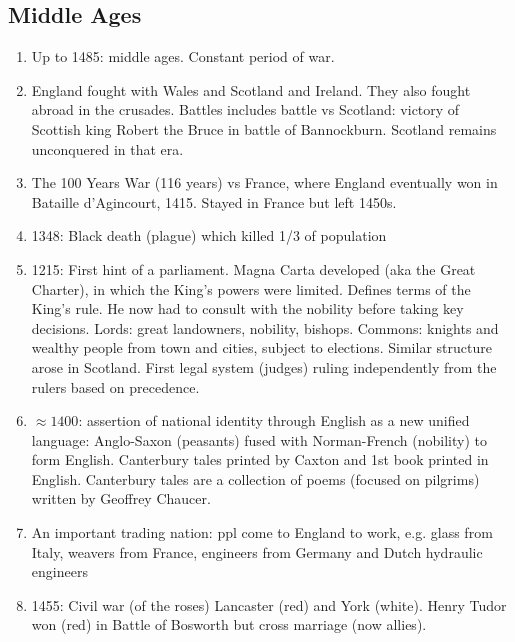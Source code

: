 \documentclass{amsart}
\begin{document}
\subsection{Middle Ages}

	\begin{enumerate}
		\item Up to 1485: middle ages. Constant period of war.
		\item England fought with Wales and Scotland and Ireland. They also fought abroad in the crusades. Battles includes battle vs Scotland: victory of Scottish king Robert the Bruce in battle of Bannockburn. Scotland remains unconquered in that era.
		\item The 100 Years War (116 years) vs France, where England eventually won in Bataille d'Agincourt, 1415. Stayed in France but left 1450s. 
		\item 1348: Black death (plague) which killed 1/3 of population
		\item 1215: First hint of a parliament. Magna Carta developed (aka the Great Charter), in which the King's powers were limited. Defines terms of the King's rule. He now had to consult with the nobility before taking key decisions. Lords: great landowners, nobility, bishops. Commons: knights and wealthy people from town and cities, subject to elections. Similar structure arose in Scotland. First legal system (judges) ruling independently from the rulers based on precedence. 
		\item $\approx 1400$: assertion of national identity through English as a new unified language: Anglo-Saxon (peasants) fused with Norman-French (nobility) to form English. Canterbury tales printed by Caxton and 1st book printed in English. Canterbury tales are a collection of poems (focused on pilgrims) written by Geoffrey Chaucer.
		\item An important trading nation: ppl come to England to work, e.g. glass from Italy, weavers from France, engineers from Germany and Dutch hydraulic engineers
		\item 1455: Civil war (of the roses) Lancaster (red) and York (white). Henry Tudor won (red) in Battle of Bosworth but cross marriage (now allies). 
\end{enumerate}
\end{document}
